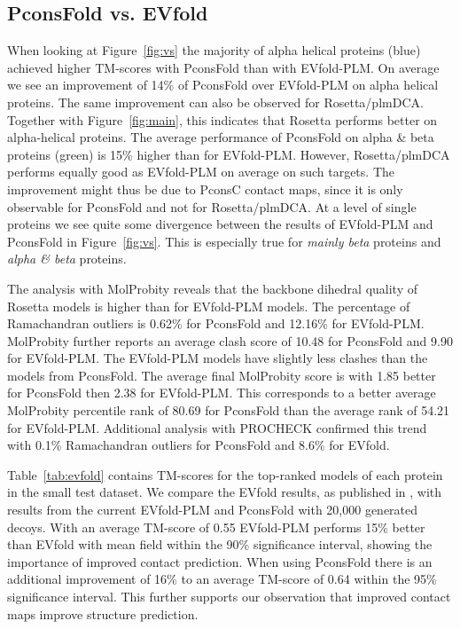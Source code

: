 \documentclass{bioinfo}
\begin{document}
\subsection{PconsFold vs. EVfold }

When looking at Figure~\ref{fig:vs} the majority of alpha helical
proteins (blue) achieved higher TM-scores with PconsFold than with
EVfold-PLM. On average we see an improvement of 14\% of PconsFold over
EVfold-PLM on alpha helical proteins. The same improvement can also be
observed for Rosetta/plmDCA. Together with Figure~\ref{fig:main},
this indicates that Rosetta performs better on alpha-helical
proteins. The average
performance of PconsFold on alpha \& beta proteins (green) is 15\%
higher than for EVfold-PLM. However, Rosetta/plmDCA performs equally good
as EVfold-PLM on average on such targets. The improvement might thus be
due to PconsC contact maps, since it is only observable for PconsFold
and not for Rosetta/plmDCA. At a level of single proteins we see quite
some divergence between the results of EVfold-PLM and PconsFold in
Figure~\ref{fig:vs}. This is especially true for {\em mainly beta}
proteins and {\em alpha \& beta} proteins.

The analysis with MolProbity reveals that the backbone dihedral
quality of Rosetta models is higher than for EVfold-PLM models. The
percentage of Ramachandran outliers is 0.62\% for PconsFold and
12.16\% for EVfold-PLM. MolProbity further reports an average clash
score of 10.48 for PconsFold and 9.90 for EVfold-PLM. The EVfold-PLM
models have slightly less clashes than the models from PconsFold. The
average final MolProbity score is with 1.85 better for PconsFold then
2.38 for EVfold-PLM. This corresponds to a better average MolProbity
percentile rank of 80.69 for PconsFold than the average rank of 54.21
for EVfold-PLM. {\color{red}Additional analysis with PROCHECK confirmed this
trend with 0.1\% Ramachandran outliers for PconsFold and 8.6\% for EVfold.}


Table~\ref{tab:evfold} contains TM-scores for the top-ranked models of
each protein in the small test dataset. We compare the EVfold results,
as published in \citeauthor{marks_protein_2011}
\citeyear{marks_protein_2011}, with results from the current
EVfold-PLM and PconsFold with 20,000 generated decoys. With an average
TM-score of 0.55 EVfold-PLM performs 15\% better than EVfold with mean
field {\color{red}within the 90\% significance interval}, showing the
importance of improved contact prediction. When using PconsFold
there is an additional improvement of 16\% to an average TM-score
of 0.64 {\color{red}within the 95\% significance interval}. This
further supports our observation that improved contact maps
improve structure prediction.
\end{document}
